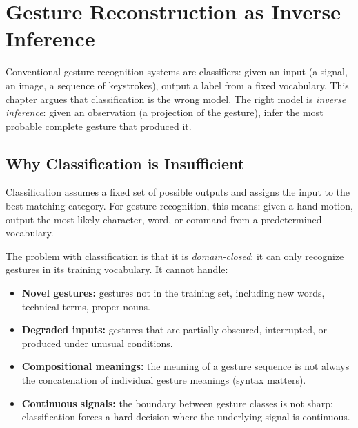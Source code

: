 
\chapter{Gesture Reconstruction as Inverse Inference}



Conventional gesture recognition systems are classifiers: given an input
(a signal, an image, a sequence of keystrokes), output a label from a
fixed vocabulary. This chapter argues that classification is the wrong
model. The right model is \emph{inverse inference}: given an observation
(a projection of the gesture), infer the most probable complete gesture
that produced it.

\section{Why Classification is Insufficient}

Classification assumes a fixed set of possible outputs and assigns
the input to the best-matching category. For gesture recognition,
this means: given a hand motion, output the most likely character, word,
or command from a predetermined vocabulary.

The problem with classification is that it is \emph{domain-closed}: it
can only recognize gestures in its training vocabulary. It cannot handle:

\begin{itemize}
  \item \textbf{Novel gestures:} gestures not in the training set,
        including new words, technical terms, proper nouns.
  \item \textbf{Degraded inputs:} gestures that are partially obscured,
        interrupted, or produced under unusual conditions.
  \item \textbf{Compositional meanings:} the meaning of a gesture
        sequence is not always the concatenation of individual gesture
        meanings (syntax matters).
  \item \textbf{Continuous signals:} the boundary between gesture classes
        is not sharp; classification forces a hard decision where
        the underlying signal is continuous.
\end{itemize}

